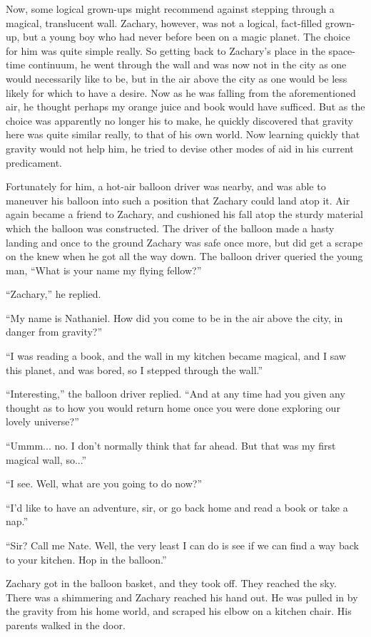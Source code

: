 Now, some logical grown-ups might recommend against stepping through a magical, translucent wall. Zachary, however, was not a logical, fact-filled grown-up, but a young boy who had never before been on a magic planet. The choice for him was quite simple really. So getting back to Zachary's place in the space-time continuum, he went through the wall and was now not in the city as one would necessarily like to be, but in the air above the city as one would be less likely for which to have a desire. Now as he was falling from the aforementioned air, he thought perhaps my orange juice and book would have sufficed. But as the choice was apparently no longer his to make, he quickly discovered that gravity here was quite similar really, to that of his own world. Now learning quickly that gravity would not help him, he tried to devise other modes of aid in his current predicament.

Fortunately for him, a hot-air balloon driver was nearby, and was able to maneuver his balloon into such a position that Zachary could land atop it. Air again became a friend to Zachary, and cushioned his fall atop the sturdy material which the balloon was constructed. The driver of the balloon made a hasty landing and once to the ground Zachary was safe once more, but did get a scrape on the knew when he got all the way down. The balloon driver queried the young man, “What is your name my flying fellow?”

“Zachary,” he replied.

“My name is Nathaniel. How did you come to be in the air above the city, in danger from gravity?”

“I was reading a book, and the wall in my kitchen became magical, and I saw this planet, and was bored, so I stepped through the wall.”

“Interesting,” the balloon driver replied. “And at any time had you given any thought as to how you would return home once you were done exploring our lovely universe?”

“Ummm... no. I don't normally think that far ahead. But that was my first magical wall, so...”

“I see. Well, what are you going to do now?”

“I'd like to have an adventure, sir, or go back home and read a book or take a nap.”

“Sir? Call me Nate. Well, the very least I can do is see if we can find a way back to your kitchen. Hop in the balloon.”

Zachary got in the balloon basket, and they took off. They reached the sky. There was a shimmering and Zachary reached his hand out. He was pulled in by the gravity from his home world, and scraped his elbow on a kitchen chair. His parents walked in the door.